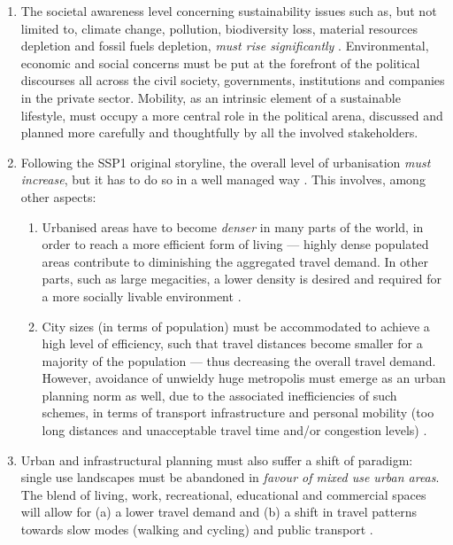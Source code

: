 \begin{enumerate}
\item The societal awareness level concerning sustainability issues such as, but not limited to, climate change, pollution, biodiversity loss, material resources depletion and fossil fuels depletion, \emph{must rise significantly} \parencite{oneill2017_roadsaheadNarratives,vuuren2017_Energylanduse}. Environmental, economic and social concerns must be put at the forefront of the political discourses all across the civil society, governments, institutions and companies in the private sector. Mobility, as an intrinsic element of a sustainable lifestyle, must occupy a more central role in the political arena, discussed and planned more carefully and thoughtfully by all the involved stakeholders.
\item Following the SSP1 original storyline, the overall level of urbanisation \emph{must increase}, but it has to do so in a well managed way \parencite{jiang2017_Globalurbanizationprojections}. This involves, among other aspects:
	\begin{enumerate}
	\item Urbanised areas have to become \emph{denser} in many parts of the world, in order to reach a more efficient form of living --- highly dense populated areas contribute to diminishing the aggregated travel demand. In other parts, such as large megacities, a lower density is desired and required for a more socially livable environment \parencite{camagni2002_Urbanmobilityurban}.
	\item City sizes (in terms of population) must be accommodated to achieve a high level of efficiency, such that travel distances become smaller for a majority of the population --- thus decreasing the overall travel demand. However, avoidance of unwieldy huge metropolis must emerge as an urban planning norm as well, due to the associated inefficiencies of such schemes, in terms of transport infrastructure and personal mobility (too long distances and unacceptable travel time and/or congestion levels) \parencite{verhoef2002_Externalitiesurbansustainability,camagni2002_Urbanmobilityurban}.
	\end{enumerate}
\item Urban and infrastructural planning must also suffer a shift of paradigm: single use landscapes must be abandoned in \emph{favour of mixed use urban areas}. The blend of living, work, recreational, educational and commercial spaces will allow for (a) a lower travel demand and (b) a shift in travel patterns towards slow modes (walking and cycling) and public transport \parencite{banister2008_sustainablemobilityparadigm,muniz2005_Urbanformecological}.

\end{enumerate}

